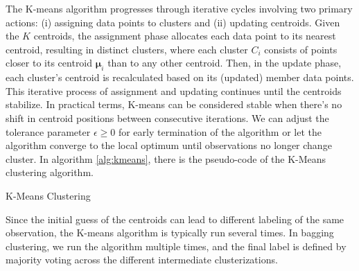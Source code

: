The K-means algorithm progresses through iterative cycles involving two primary actions: (i) assigning data points to clusters and (ii) updating centroids. Given the $K$ centroids, the assignment phase allocates each data point to its nearest centroid, resulting in distinct clusters, where each cluster $C_i$ consists of points closer to its centroid $\bm{\mu}_i$ than to any other centroid. Then, in the update phase, each cluster's centroid is recalculated based on its (updated) member data points. This iterative process of assignment and updating continues until the centroids stabilize. In practical terms, K-means can be considered stable when there's no shift in centroid positions between consecutive iterations. We can adjust the tolerance parameter $\epsilon \geq 0$ for early termination of the algorithm or let the algorithm converge to the local optimum until observations no longer change cluster. In algorithm \ref{alg:kmeans}, there is the pseudo-code of the K-Means clustering algorithm.
\begin{algorithm}
\small
    \caption{K-Means Clustering}
    \label{alg:kmeans}
    \begin{algorithmic}[1]
    \REPEAT
    \ENDFOR
    \ENDFOR
    \end{algorithmic}
\end{algorithm} 
Since the initial guess of the centroids can lead to different labeling of the same observation, the K-means algorithm is typically run several times. In bagging clustering, we run the algorithm multiple times, and the final label is defined by majority voting across the different intermediate clusterizations.



